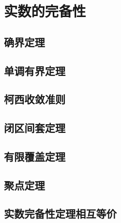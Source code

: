 
\section{实数的完备性}
\label{sec:completeness-of-real-number}

\subsection{确界定理}
\label{sec:supremum-infimum-theorem}

\subsection{单调有界定理}
\label{sec:dull-bound-number-sequence-convergence-theorem}

\subsection{柯西收敛准则}
\label{sec:cauchy-convergence-number-sequence}

\subsection{闭区间套定理}
\label{sec:closed-interval-theorem}

\subsection{有限覆盖定理}
\label{sec:finite-coverage-theorem}

\subsection{聚点定理}
\label{sec:collect-point-theorem}





\subsection{实数完备性定理相互等价}
\label{sec:the-proof-of-real-completeness-theorems}




